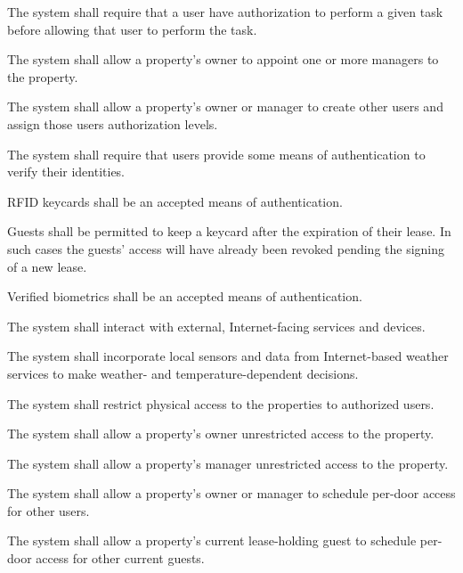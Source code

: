\documentclass[letter,titlepage,oneside,english]{report}
\begin{document}
\begin{fr}
\item
  The system shall require that a user have authorization to perform a given task before allowing that user to perform the task.
  \begin{fr}
  \item
    The system shall allow a property's owner to appoint one or more managers to the property.
  \item
    The system shall allow a property's owner or manager to create other users and assign those users authorization levels.
  \item
    The system shall require that users provide some means of authentication to verify their identities.
    \begin{fr}
    \item
      RFID keycards shall be an accepted means of authentication.
      \begin{fr}
      \item
        Guests shall be permitted to keep a keycard after the expiration of their lease.
        In such cases the guests' access will have already been revoked pending the signing of a new lease.
      \end{fr}
    \item
      Verified biometrics shall be an accepted means of authentication.
    \end{fr}
  \end{fr}
\item
  The system shall interact with external, Internet-facing services and devices.
  \begin{fr}
  \item
    The system shall incorporate local sensors and data from Internet-based weather services to make weather- and temperature-dependent decisions.
  \end{fr}
\item
  The system shall restrict physical access to the properties to authorized users.
  \begin{fr}
  \item
    The system shall allow a property's owner unrestricted access to the property.
  \item
    The system shall allow a property's manager unrestricted access to the property.
  \item
    The system shall allow a property's owner or manager to schedule per-door access for other users.
  \item
    The system shall allow a property's current lease-holding guest to schedule per-door access for other current guests.

\end{fr}
\end{fr}
\end{document}
